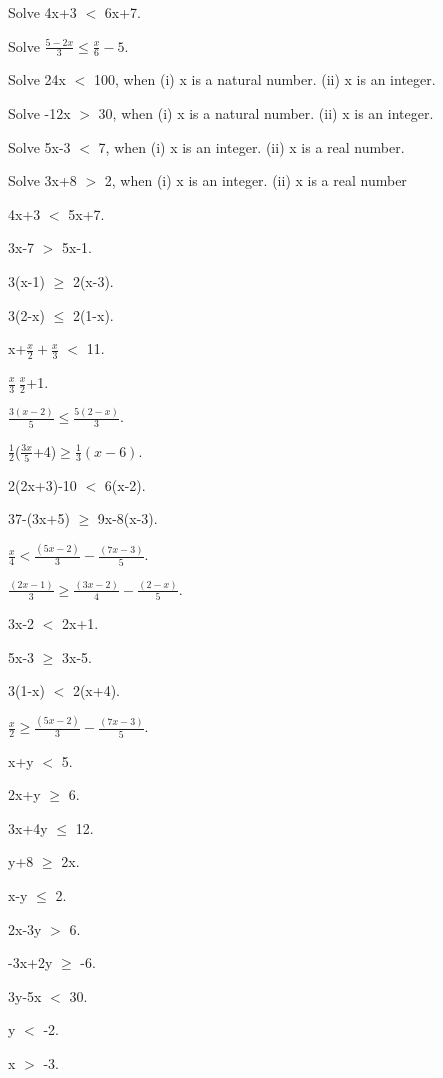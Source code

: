     \item Solve 4x+3 $<$ 6x+7.
    \item Solve $\frac{5-2x}{3} \leq \frac{x}{6}-5$.

	\item Solve 24x $<$ 100, when
	(i) x is a natural number.
	(ii) x is an integer.
	\item Solve -12x $>$ 30, when
	(i) x is a natural number.
	(ii) x is an integer.
	\item Solve 5x-3 $<$ 7, when
	(i) x is an integer.
	(ii) x is a real number.
	\item Solve 3x+8 $>$ 2, when
	(i) x is an integer.
	(ii) x is a real number
	
	\item 4x+3 $<$ 5x+7.
	\item 3x-7 $>$ 5x-1.
	\item 3(x-1) $\geq$ 2(x-3).
	\item 3(2-x) $\leq$ 2(1-x).
	\item x+$\frac{x}{2}+\frac{x}{3}$ $<$ 11.
	\item $\frac{x}{3}\>\frac{x}{2}$+1.
	\item $\frac{3(x-2)}{5}\leq\frac{5(2-x)}{3}$.
	\item $ \frac{1}{2}$($\frac{3x}{5}$+4)$\geq\frac{1}{3}(x-6)$.
	\item 2(2x+3)-10 $<$ 6(x-2).
	\item 37-(3x+5) $\geq$ 9x-8(x-3).
	\item $\frac{x}{4}<\frac{(5x-2)}{3}-\frac{(7x-3)}{5}$.
	\item $\frac{(2x-1)}{3}\geq\frac{(3x-2)}{4}-\frac{(2-x)}{5}$.
	
    \item 3x-2 $<$ 2x+1.
    \item 5x-3 $\geq$ 3x-5.
    \item 3(1-x) $<$ 2(x+4).
    \item $\frac{x}{2}\geq\frac{(5x-2)}{3}-\frac{(7x-3)}{5}$.

    \item x+y $<$ 5.
    \item 2x+y $\geq$ 6.    
    \item 3x+4y $\leq$ 12.
    \item y+8 $\geq$ 2x.
    \item x-y $\leq$ 2.
    \item 2x-3y $>$ 6.
    \item -3x+2y $\geq$ -6.
    \item 3y-5x $<$ 30.
    \item y $<$ -2.
    \item x $>$ -3.
    
